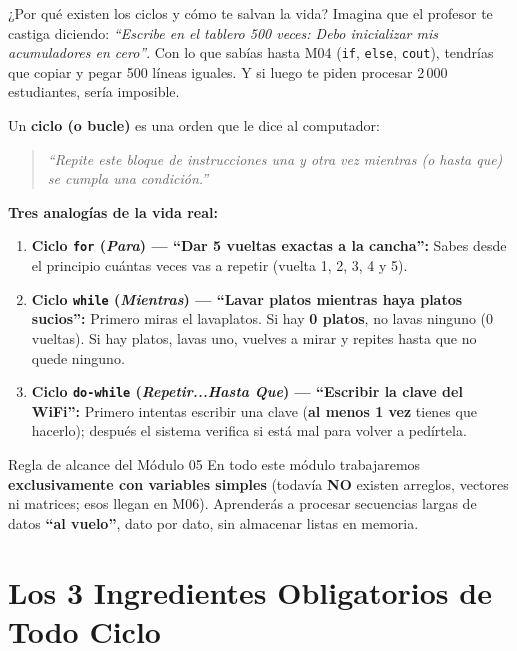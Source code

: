 \documentclass[11pt,letterpaper]{article}
\begin{document}
\begin{paratontos}{¿Por qué existen los ciclos y cómo te salvan la vida?}
Imagina que el profesor te castiga diciendo: \emph{``Escribe en el tablero 500 veces: Debo inicializar mis acumuladores en cero''}. Con lo que sabías hasta M04 (\texttt{if}, \texttt{else}, \texttt{cout}), tendrías que copiar y pegar 500 líneas iguales. Y si luego te piden procesar 2\,000 estudiantes, sería imposible.

Un \textbf{ciclo (o bucle)} es una orden que le dice al computador:
\begin{quote}
\emph{``Repite este bloque de instrucciones una y otra vez mientras (o hasta que) se cumpla una condición.''}
\end{quote}

\textbf{Tres analogías de la vida real:}
\begin{enumerate}
  \item \textbf{Ciclo \texttt{for} (\textit{Para}) --- ``Dar 5 vueltas exactas a la cancha'':} Sabes desde el principio cuántas veces vas a repetir (vuelta 1, 2, 3, 4 y 5).
  \item \textbf{Ciclo \texttt{while} (\textit{Mientras}) --- ``Lavar platos mientras haya platos sucios'':} Primero miras el lavaplatos. Si hay \textbf{0 platos}, no lavas ninguno (0 vueltas). Si hay platos, lavas uno, vuelves a mirar y repites hasta que no quede ninguno.
  \item \textbf{Ciclo \texttt{do-while} (\textit{Repetir...Hasta Que}) --- ``Escribir la clave del WiFi'':} Primero intentas escribir una clave (\textbf{al menos 1 vez} tienes que hacerlo); después el sistema verifica si está mal para volver a pedírtela.
\end{enumerate}
\end{paratontos}

\begin{consejo}{Regla de alcance del Módulo 05}
En todo este módulo trabajaremos \textbf{exclusivamente con variables simples} (todavía \textbf{NO} existen arreglos, vectores ni matrices; esos llegan en M06). Aprenderás a procesar secuencias largas de datos \textbf{``al vuelo''}, dato por dato, sin almacenar listas en memoria.
\end{consejo}

\section{Los 3 Ingredientes Obligatorios de Todo Ciclo}
\end{document}
